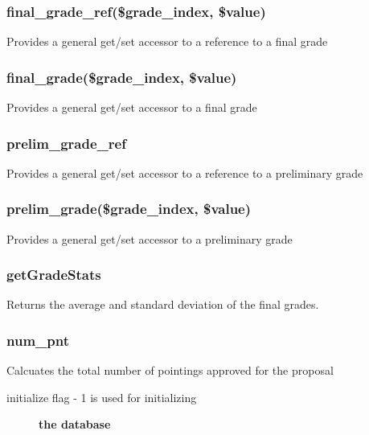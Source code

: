\documentclass{article}
\begin{document}
\subsubsection*{final\_grade\_ref(\$grade\_index, \$value)\label{Proposal_final_grade_ref_grade_index_value_}}


Provides a general get/set accessor to a reference to a final grade

\subsubsection*{final\_grade(\$grade\_index, \$value)\label{Proposal_final_grade_grade_index_value_}}


Provides a general get/set accessor to a final grade

\subsubsection*{prelim\_grade\_ref\label{Proposal_prelim_grade_ref}}


Provides a general get/set accessor to a reference to a preliminary grade

\subsubsection*{prelim\_grade(\$grade\_index, \$value)\label{Proposal_prelim_grade_grade_index_value_}}


Provides a general get/set accessor to a preliminary grade

\subsubsection*{getGradeStats\label{Proposal_getGradeStats}}


Returns the average and standard deviation of the final grades.

\subsubsection*{num\_pnt\label{Proposal_num_pnt}}


Calcuates the total number of pointings approved for the proposal

\begin{description}

\item[{initialize flag - 1 is used for initializing}] \textbf{the database}\end{description}
\end{document}
